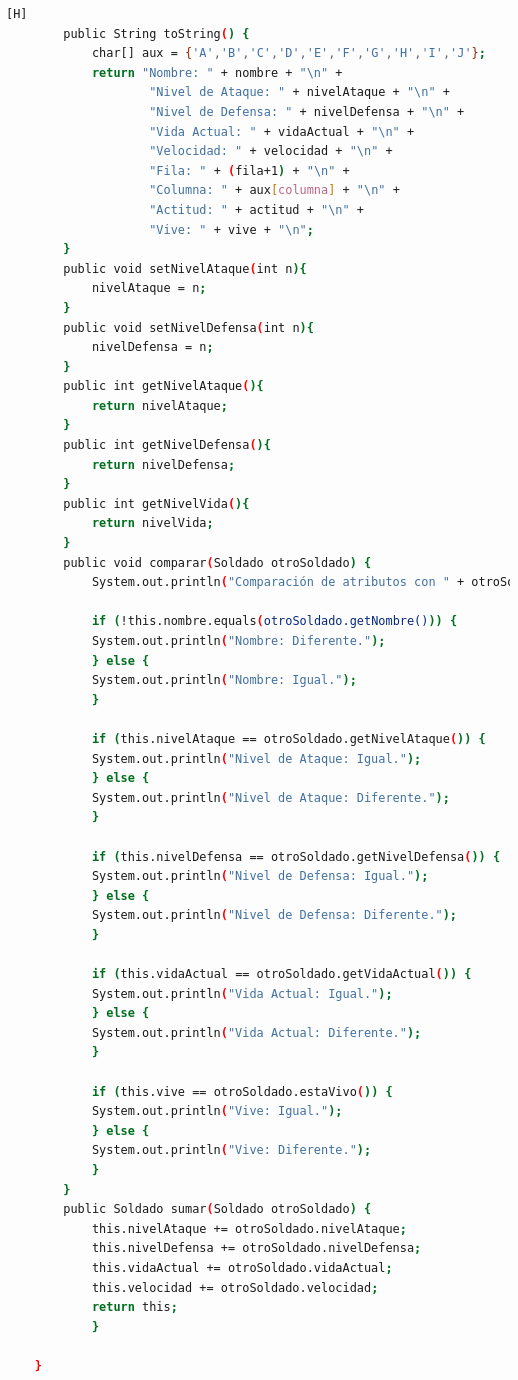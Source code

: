 \documentclass{article}
\begin{document}
\begin{lstlisting}[language=bash,caption={Creando la clase Soldado}][H]
		public String toString() {
			char[] aux = {'A','B','C','D','E','F','G','H','I','J'};
	    	return "Nombre: " + nombre + "\n" +
	          	 	"Nivel de Ataque: " + nivelAtaque + "\n" +
	           		"Nivel de Defensa: " + nivelDefensa + "\n" +
	           		"Vida Actual: " + vidaActual + "\n" +
	           		"Velocidad: " + velocidad + "\n" +
	          		"Fila: " + (fila+1) + "\n" +
	           		"Columna: " + aux[columna] + "\n" +
	           		"Actitud: " + actitud + "\n" +
	           		"Vive: " + vive + "\n";
		}
		public void setNivelAtaque(int n){
			nivelAtaque = n;
		}
		public void setNivelDefensa(int n){
			nivelDefensa = n;
		}
		public int getNivelAtaque(){
			return nivelAtaque;
		}
		public int getNivelDefensa(){
			return nivelDefensa;
		}
		public int getNivelVida(){
			return nivelVida;
		}
		public void comparar(Soldado otroSoldado) {
		    System.out.println("Comparación de atributos con " + otroSoldado.getNombre() + ":");

		    if (!this.nombre.equals(otroSoldado.getNombre())) {
			System.out.println("Nombre: Diferente.");
		    } else {
			System.out.println("Nombre: Igual.");
		    }

		    if (this.nivelAtaque == otroSoldado.getNivelAtaque()) {
			System.out.println("Nivel de Ataque: Igual.");
		    } else {
			System.out.println("Nivel de Ataque: Diferente.");
		    }

		    if (this.nivelDefensa == otroSoldado.getNivelDefensa()) {
			System.out.println("Nivel de Defensa: Igual.");
		    } else {
			System.out.println("Nivel de Defensa: Diferente.");
		    }

		    if (this.vidaActual == otroSoldado.getVidaActual()) {
			System.out.println("Vida Actual: Igual.");
		    } else {
			System.out.println("Vida Actual: Diferente.");
		    }

		    if (this.vive == otroSoldado.estaVivo()) {
			System.out.println("Vive: Igual.");
		    } else {
			System.out.println("Vive: Diferente.");
		    }
		}
		public Soldado sumar(Soldado otroSoldado) {
			this.nivelAtaque += otroSoldado.nivelAtaque;
			this.nivelDefensa += otroSoldado.nivelDefensa;
			this.vidaActual += otroSoldado.vidaActual;
			this.velocidad += otroSoldado.velocidad;
			return this;
	    	}

	}

	
	\end{lstlisting}	
\end{document}
